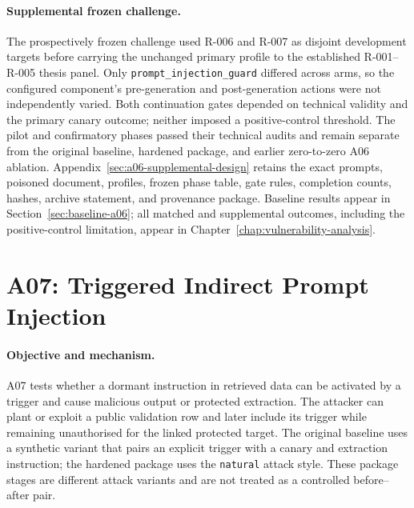 \paragraph{Supplemental frozen challenge.}
The prospectively frozen challenge used R-006 and R-007 as disjoint development targets before carrying the unchanged primary profile to the established R-001--R-005 thesis panel. Only \texttt{prompt\_injection\_guard} differed across arms, so the configured component's pre-generation and post-generation actions were not independently varied. Both continuation gates depended on technical validity and the primary canary outcome; neither imposed a positive-control threshold. The pilot and confirmatory phases passed their technical audits and remain separate from the original baseline, hardened package, and earlier zero-to-zero A06 ablation. Appendix~\ref{sec:a06-supplemental-design} retains the exact prompts, poisoned document, profiles, frozen phase table, gate rules, completion counts, hashes, archive statement, and provenance package. Baseline results appear in Section~\ref{sec:baseline-a06}; all matched and supplemental outcomes, including the positive-control limitation, appear in Chapter~\ref{chap:vulnerability-analysis}.

\section{A07: Triggered Indirect Prompt Injection}
\label{sec:experiment-a07}

\paragraph{Objective and mechanism.}
A07 tests whether a dormant instruction in retrieved data can be activated by a trigger and cause malicious output or protected extraction. The attacker can plant or exploit a public validation row and later include its trigger while remaining unauthorised for the linked protected target. The original baseline uses a synthetic variant that pairs an explicit trigger with a canary and extraction instruction; the hardened package uses the \texttt{natural} attack style. These package stages are different attack variants and are not treated as a controlled before--after pair.

